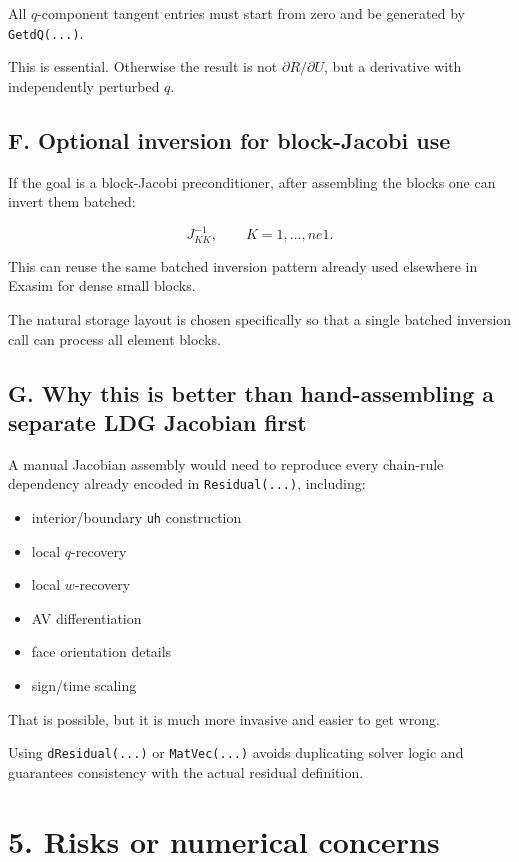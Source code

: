 \documentclass[11pt]{article}
\begin{document}
All $q$-component tangent entries must start from zero and be generated by
\texttt{GetdQ(...)}.

This is essential. Otherwise the result is not $\partial R/\partial U$, but a
derivative with independently perturbed $q$.

\subsection*{F. Optional inversion for block-Jacobi use}

If the goal is a block-Jacobi preconditioner, after assembling the blocks one
can invert them batched:

\[
J_{KK}^{-1}, \qquad K = 1,\dots,ne1.
\]

This can reuse the same batched inversion pattern already used elsewhere in
Exasim for dense small blocks.

The natural storage layout is chosen specifically so that a single batched
inversion call can process all element blocks.

\subsection*{G. Why this is better than hand-assembling a separate LDG Jacobian first}

A manual Jacobian assembly would need to reproduce every chain-rule dependency
already encoded in \texttt{Residual(...)}, including:

\begin{itemize}[leftmargin=*]
\item interior/boundary \texttt{uh} construction
\item local $q$-recovery
\item local $w$-recovery
\item AV differentiation
\item face orientation details
\item sign/time scaling
\end{itemize}

That is possible, but it is much more invasive and easier to get wrong.

Using \texttt{dResidual(...)} or \texttt{MatVec(...)} avoids duplicating solver
logic and guarantees consistency with the actual residual definition.

\section*{5. Risks or numerical concerns}
\end{document}
